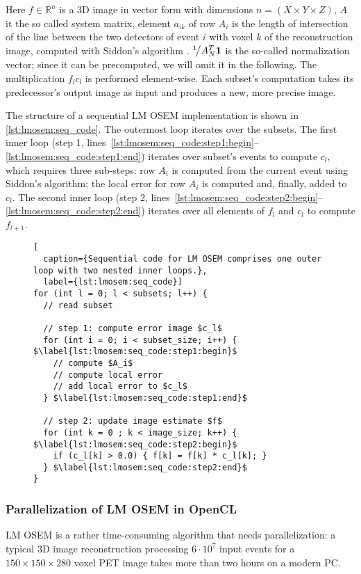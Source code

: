 Here $f \in \mathbb{R}^n$ is a 3D image in vector form with dimensions $n = (X \times Y \times Z)$, $A$ it the so called system matrix, element $a_{ik}$ of row $A_i$ is the length of intersection of the line between the two detectors of event $i$ with voxel $k$ of the reconstruction image, computed with Siddon's algorithm \cite{Siddon1985}.
${}^{1}\!\big/{A_N^T \textbf{1}}$ is the so-called normalization vector; since it can be precomputed, we will omit it in the following.
The multiplication $f_{l}c_{l}$ is performed element-wise.
Each subset's computation takes its predecessor's output image as input and produces a new, more precise image.

The structure of a sequential LM OSEM implementation is shown in \autoref{lst:lmosem:seq_code}.
The outermost loop iterates over the subsets.
The first inner loop (step 1, lines~\autoref{lst:lmosem:seq_code:step1:begin}--\autoref{lst:lmosem:seq_code:step1:end}) iterates over subset's events to compute $c_l$, which requires three sub-steps:
row $A_i$ is computed from the current event using Siddon's algorithm;
the local error for row $A_i$ is computed and, finally, added to $c_l$.
The second inner loop (step 2, lines~\autoref{lst:lmosem:seq_code:step2:begin}--\autoref{lst:lmosem:seq_code:step2:end}) iterates over all elements of $f_l$ and $c_l$ to compute $f_{l+1}$.
\begin{figure}
\begin{lstlisting}[
  caption={Sequential code for LM OSEM comprises one outer loop with two nested inner loops.},
  label={lst:lmosem:seq_code}]
for (int l = 0; l < subsets; l++) {
  // read subset

  // step 1: compute error image $c_l$
  for (int i = 0; i < subset_size; i++) { $\label{lst:lmosem:seq_code:step1:begin}$
    // compute $A_i$
    // compute local error
    // add local error to $c_l$
  } $\label{lst:lmosem:seq_code:step1:end}$

  // step 2: update image estimate $f$
  for (int k = 0 ; k < image_size; k++) { $\label{lst:lmosem:seq_code:step2:begin}$
    if (c_l[k] > 0.0) { f[k] = f[k] * c_l[k]; }
  } $\label{lst:lmosem:seq_code:step2:end}$
}
\end{lstlisting}
\end{figure}

\subsubsection{Parallelization of LM OSEM in OpenCL}
\label{sec:parallel_implementation}
LM OSEM is a rather time-consuming algorithm that needs parallelization:
a typical 3D image reconstruction processing $6 \cdot 10^7$ input events for a $150 \times 150 \times 280$ voxel PET image takes more than two hours on a modern PC.

